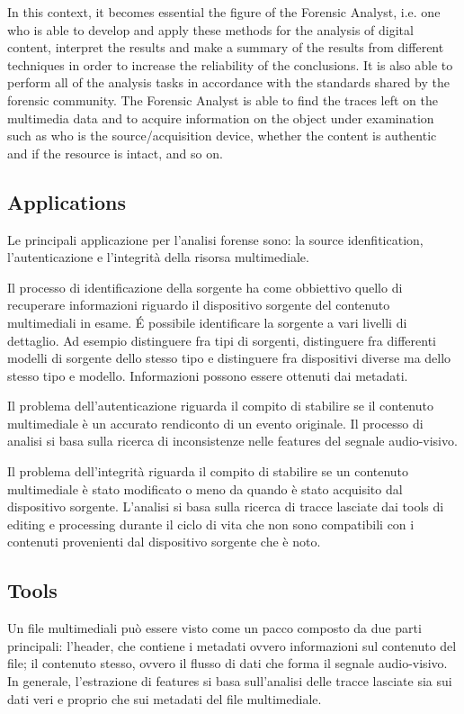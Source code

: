 In this context, it becomes essential the figure of the Forensic Analyst, i.e. one who is able to develop and apply these methods for the analysis of digital content, interpret the results and make a summary of the results from different techniques in order to increase the reliability of the conclusions. It is also able to perform all of the analysis tasks in accordance with the standards shared by the forensic community. The Forensic Analyst is able to find the traces left on the multimedia data and to acquire information on the object under examination such as who is the source/acquisition device, whether the content is authentic and if the resource is intact, and so on.

\subsection{Applications}

Le principali applicazione per l'analisi forense sono: la source idenfitication, l'autenticazione e l'integrità della risorsa multimediale.

Il processo di identificazione della sorgente ha come obbiettivo quello di recuperare informazioni riguardo il dispositivo sorgente del contenuto multimediali in esame. É possibile identificare la sorgente a vari livelli di dettaglio. Ad esempio distinguere fra tipi di sorgenti, distinguere fra differenti modelli di sorgente dello stesso tipo e distinguere fra dispositivi diverse ma dello stesso tipo e modello. Informazioni possono essere ottenuti dai metadati.

Il problema dell'autenticazione riguarda il compito di stabilire se il contenuto multimediale è un accurato rendiconto di un evento originale. Il processo di analisi si basa sulla ricerca di inconsistenze nelle features del segnale audio-visivo.

Il problema dell'integrità riguarda il compito di stabilire se un contenuto multimediale è stato modificato o meno da quando è stato acquisito dal dispositivo sorgente. L'analisi si basa sulla ricerca di tracce lasciate dai tools di editing e processing durante il ciclo di vita che non sono compatibili con i contenuti provenienti dal dispositivo sorgente che è noto.

\subsection{Tools}

Un file multimediali può essere visto come un pacco composto da due parti principali: l'header, che contiene i metadati ovvero informazioni sul contenuto del file; il contenuto stesso, ovvero il flusso di dati che forma il segnale audio-visivo.
In generale, l'estrazione di features si basa sull'analisi delle tracce lasciate sia sui dati veri e proprio che sui metadati del file multimediale.

